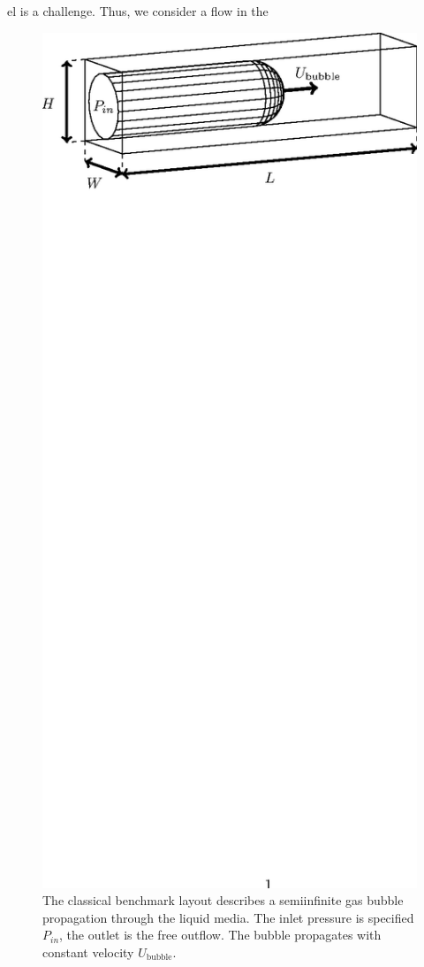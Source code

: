 \documentclass[preprint,12pt]{elsarticle}
\begin{document}
el is a challenge. Thus, we consider a flow in the
\begin{figure}[htb!]
\includegraphics*[bb=153 610 410 717,width=\textwidth]{benchmark_classical.eps} 
\caption{The classical benchmark layout describes a semiinfinite gas bubble
propagation through the liquid media. The inlet pressure is specified $P_{in}$, the outlet is the
free outflow. The bubble propagates with constant velocity $U_{\mathrm{bubble}}$. 
\label{fig:classical:benchmark}}
\end{figure}
\end{document}
